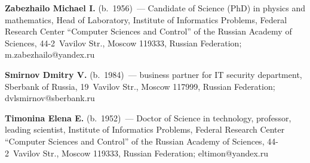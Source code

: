 \vspace*{3pt}

\noindent
\textbf{Zabezhailo Michael I.} (b.\ 1956)~--- 
Candidate of Science (PhD) in physics and mathematics,  Head of Laboratory, 
Institute of Informatics Problems, Federal Research Center ``Computer 
Sciences and Control'' of the Russian Academy of Sciences, 44-2~Vavilov Str., Moscow 
119333, Russian Federation; \mbox{m.zabezhailo@yandex.ru}

\vspace*{3pt}

\noindent
\textbf{Smirnov Dmitry V.} (b.\ 1984)~--- 
business partner for IT security department, Sberbank of 
Russia, 19~Vavilov Str., Moscow 117999, Russian Federation; \mbox{dvlsmirnov@sberbank.ru}

\vspace*{3pt}

\noindent
\textbf{Timonina Elena E.} (b.\ 1952)~--- 
Doctor of Science in technology, professor, leading scientist, 
Institute of Informatics Problems, Federal Research Center ``Computer 
Sciences and Control'' of the Russian Academy of Sciences, 44-2~Vavilov Str., Moscow 
119333, Russian Federation; \mbox{eltimon@yandex.ru}
     

\label{end\stat}


\renewcommand{\bibname}{\protect\rm Литература} 